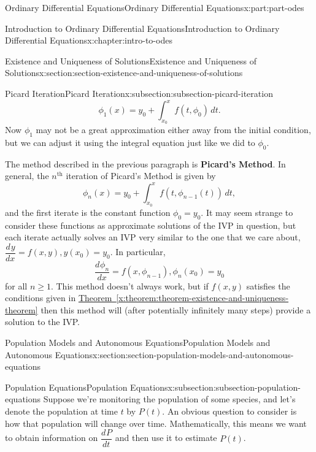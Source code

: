 \documentclass[oneside,10pt,]{book}
\newcommand{\xreffont}{\relax}
\newcommand{\terminology}[1]{\textbf{#1}}
\numberwithin{equation}{part}
\newcommand{\dv}[3][]{\dfrac{d^{#1} #2}{d #3^{#1}}}
\begin{document}
\begin{partptx}{Ordinary Differential Equations}{}{Ordinary Differential Equations}{}{}{x:part:part-odes}
\begin{chapterptx}{Introduction to Ordinary Differential Equations}{}{Introduction to Ordinary Differential Equations}{}{}{x:chapter:intro-to-odes}
\begin{sectionptx}{Existence and Uniqueness of Solutions}{}{Existence and Uniqueness of Solutions}{}{}{x:section:section-existence-and-uniqueness-of-solutions}
\begin{subsectionptx}{Picard Iteration}{}{Picard Iteration}{}{}{x:subsection:subsection-picard-iteration}
\begin{equation*}
\phi_{1}(x) = y_{0} + \int_{x_{0}}^{x}f(t,\phi_{0})\,dt.
\end{equation*}
Now \(\phi_{1}\) may not be a great approximation either away from the initial condition, but we can adjust it using the integral equation just like we did to \(\phi_{0}\).%
\par
The method described in the previous paragraph is \terminology{Picard's Method}. In general, the \(n^{\text{th}}\) iteration of Picard's Method is given by%
\begin{equation*}
\phi_{n}(x) = y_{0}+\int_{x_{0}}^{x}f(t,\phi_{n-1}(t))\,dt,
\end{equation*}
and the first iterate is the constant function \(\phi_{0} = y_{0}.\) It may seem strange to consider these functions as approximate solutions of the IVP in question, but each iterate actually solves an IVP very similar to the one that we care about, \(\dv{y}{x} = f(x,y), y(x_{0}) = y_{0}\). In particular,%
\begin{equation*}
\dv{\phi_{n}}{x} = f(x,\phi_{n-1}), \phi_{n}(x_{0}) = y_{0}
\end{equation*}
for all \(n\geq1\). This method doesn't always work, but if \(f(x,y)\) satisfies the conditions given in \hyperref[x:theorem:theorem-existence-and-uniqueness-theorem]{Theorem~{\xreffont\ref{x:theorem:theorem-existence-and-uniqueness-theorem}}} then this method will (after potentially infinitely many steps) provide a solution to the IVP.%
\end{subsectionptx}
\end{sectionptx}
%
%
\typeout{************************************************}
\typeout{************************************************}
%
\begin{sectionptx}{Population Models and Autonomous Equations}{}{Population Models and Autonomous Equations}{}{}{x:section:section-population-models-and-autonomous-equations}
%
%
\typeout{************************************************}
\typeout{************************************************}
%
\begin{subsectionptx}{Population Equations}{}{Population Equations}{}{}{x:subsection:subsection-population-equations}
Suppose we're monitoring the population of some species, and let's denote the population at time \(t\) by \(P(t)\). An obvious question to consider is how that population will change over time. Mathematically, this means we want to obtain information on \(\dv{P}{t}\) and then use it to estimate \(P(t)\).%

\end{subsectionptx}
\end{sectionptx}
\end{chapterptx}
\end{partptx}
\end{document}
